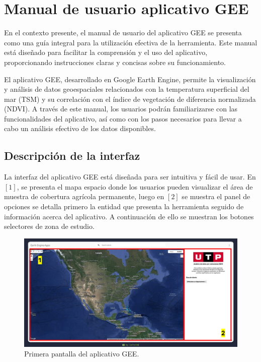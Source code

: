 \section{Manual de usuario aplicativo GEE}

En el contexto presente, el manual de usuario del aplicativo GEE se presenta como una guía integral para la utilización efectiva de la herramienta. Este manual está diseñado para facilitar la comprensión y el uso del aplicativo, proporcionando instrucciones claras y concisas sobre su funcionamiento.

El aplicativo GEE, desarrollado en Google Earth Engine, permite la visualización y análisis de datos geoespaciales relacionados con la temperatura superficial del mar (TSM) y su correlación con el índice de vegetación de diferencia normalizada (NDVI). A través de este manual, los usuarios podrán familiarizarse con las funcionalidades del aplicativo, así como con los pasos necesarios para llevar a cabo un análisis efectivo de los datos disponibles.

\subsection{Descripción de la interfaz}

La interfaz del aplicativo GEE está diseñada para ser intuitiva y fácil de usar. En $[1]$, se presenta el mapa espacio donde los usuarios pueden visualizar el área de muestra de cobertura agrícola permanente, luego en $[2]$ se muestra el panel de opciones se detalla primero la entidad que presenta la herramienta seguido de información acerca del aplicativo. A continuación de ello se muestran los botones selectores de zona de estudio.

\begin{figure}[ht]
  \centering
  \includegraphics[width=\textwidth, trim=20px 25px 20px 20px, clip]{assets/canvas.png}
  \caption{Primera pantalla del aplicativo GEE.}
  \label{fig:canvas}
\end{figure}


